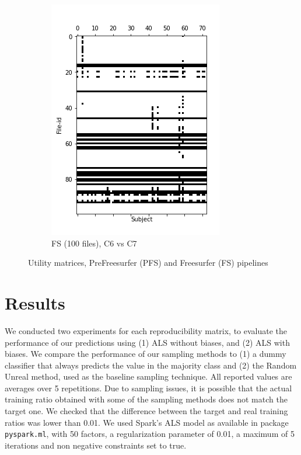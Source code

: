 \documentclass[10pt, conference, compsocconf]{IEEEtran}
\begin{document}
\begin{figure}[h!]
\begin{subfigure}[b]{0.45\columnwidth}
        \includegraphics[width=\columnwidth]{data/Utility_Matrix/FS-100files/FS-First-bound-100files.png}
  \caption{FS (100 files), C6 vs C7}
  \end{subfigure}
  \caption{Utility matrices, PreFreesurfer (PFS) and Freesurfer (FS) pipelines}
    \label{fig:utility-matrices}
\end{figure}

\section{Results}

\label{sec:results}

We conducted two experiments for each reproducibility matrix, to evaluate the performance of our 
predictions using (1) ALS without biases, and (2) ALS with biases. We 
compare the performance of our sampling methods to (1) a dummy 
classifier that always predicts the value in the majority class and (2) 
the Random Unreal method, used as the baseline sampling technique. All 
reported values are averages over 5 repetitions. Due to sampling 
issues, it is possible that the actual training ratio obtained with 
some of the sampling methods does not 
match the target one. We checked that the difference between the target 
and real training ratios was lower than 0.01. We used Spark's ALS model 
as available in package \texttt{pyspark.ml}, with 50 factors, a 
regularization parameter of 0.01, a maximum of 5 iterations and non 
negative constraints set to true.
\end{document}
